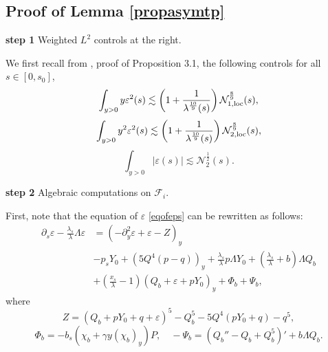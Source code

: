 \documentclass[11pt,a4paper,reqno]{amsart}
\theoremstyle{remark}
\numberwithin{equation}{section}
\newcommand{\be}{\begin{equation}}
\newcommand{\ee}{\end{equation}}
\def\e{\varepsilon}
\def\lsl{\frac{\lambda_s}{\lambda}}
\def\l{\lambda}
\def\lsl{\frac{\lambda_s}{\lambda}}
\def\zz{Z}
\def\Yz{Y_0}
\begin{document}
\subsection{Proof of Lemma  \ref{propasymtp}}

 {\bf step 1} Weighted $L^2$ controls at the right.
 
We first recall from \cite{MMR1}, proof of Proposition 3.1, the following controls for all $s\in [0,s_0]$,
\be
\label{weightedone}
\int_{y>0}y\e^2(s)\lesssim \left(1+\frac{1}{\l^{\frac{10}9}(s)}\right)\mathcal{N}_{1,\rm loc}^{\frac 89}(s),
\ee
\be
\label{weightedonebis}
\int_{y>0}y^2\e^2(s)\lesssim \left(1+\frac{1}{\l^{\frac {10}9}(s)}\right)\mathcal{N}_{2,\rm loc}^{\frac 89}(s),
\ee
\be
\label{lonebound}
\int_{y>0}|\e(s)|\lesssim \mathcal N_2^{\frac{1}{2}}(s).
\ee
 \medskip

{\bf step 2} Algebraic computations on $\mathcal F_{i}$.
 
First, note that the equation of $\e$ \eqref{eqofeps} can be rewritten as follows:
\begin{align}  \nonumber  
  \partial_s \varepsilon -\lsl  \Lambda \e & = \left(-\partial_{y}^2 \e  + \e  - \zz\right)_y
\\ & -p_s \Yz +(  5 Q^4 (p-q) )_y +\lsl p\Lambda \Yz
 + \left(\frac {{\lambda}_{s}}{{\lambda}}+{b}\right) {\Lambda} Q_b 
\nonumber \\
&+ \left(\frac { x_{s}}{\lambda} -1\right) (Q_b + \varepsilon+p  \Yz)_y   
+ \Phi_{b}  
 + \Psi_{{b}} ,
\label{eqebis}
\end{align}
where
$$
\zz=(Q_b+p\Yz+q+ \varepsilon )^5 -Q_b^5 - 5Q^4 (p\Yz+q)-q^5,
$$
$$\Phi_b = - {b}_{s} \left(\chi_b   + \gamma   y (\chi_b)_y\right) P,\quad  -\Psi_b=\left(Q_b''- Q_b+ Q_b^5\right)'+b {\Lambda} Q_b.$$
\end{document}
